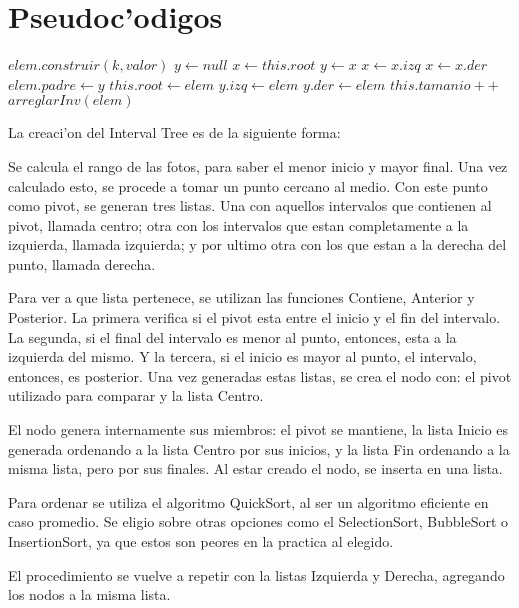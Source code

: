 \section{Pseudoc'odigos}
\begin{algorithmic}[1]
\STATE $elem.construir(k, valor)$
\STATE $y \leftarrow null$
\STATE $x \leftarrow this.root$
	\STATE $y \leftarrow x$
		\STATE $x \leftarrow x.izq$
	\ELSE
		\STATE $x \leftarrow x.der$
	\ENDIF
\ENDWHILE
\STATE $elem.padre \leftarrow y$
	\STATE $this.root \leftarrow elem$
	\STATE $y.izq \leftarrow elem$
\ELSE
	\STATE $y.der \leftarrow elem$
\ENDIF
\STATE $this.tamanio++$
\STATE $arreglarInv(elem)$
\end{algorithmic}

\vspace{2em}

La creaci'on del Interval Tree es de la siguiente forma:

Se calcula el rango de las fotos, para saber el menor inicio y mayor final. Una vez calculado esto, se procede a tomar un punto cercano al medio. Con este punto como pivot, se generan tres listas. Una con aquellos intervalos que contienen al pivot, llamada centro; otra con los intervalos que estan completamente a la izquierda, llamada izquierda; y por ultimo otra con los que estan a la derecha del punto, llamada derecha.

Para ver a que lista pertenece, se utilizan las funciones Contiene, Anterior y Posterior. La primera verifica si el pivot esta entre el inicio y el fin del intervalo. La segunda, si el final del intervalo es menor al punto, entonces, esta a la izquierda del mismo. Y la tercera, si el inicio es mayor al punto, el intervalo, entonces, es posterior.
Una vez generadas estas listas, se crea el nodo con: el pivot utilizado para comparar y la lista Centro. 

El nodo genera internamente sus miembros: el pivot se mantiene, la lista Inicio es generada ordenando a la lista Centro por sus inicios, y la lista Fin ordenando a la misma lista, pero por sus finales.
Al estar creado el nodo, se inserta en una lista.

Para ordenar se utiliza el algoritmo QuickSort, al ser un algoritmo eficiente en caso promedio. Se eligio sobre otras opciones como el SelectionSort, BubbleSort o InsertionSort, ya que estos son peores en la practica al elegido.

El procedimiento se vuelve a repetir con la listas Izquierda y Derecha, agregando los nodos a la misma lista.

